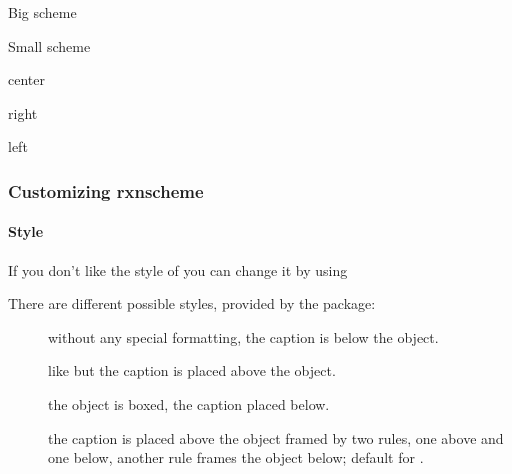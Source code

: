 \documentclass[toc=index,DIV10]{cnpkgdoc}
\begin{document}
\begin{beispiel}
 \begin{rxnscheme}[,,,2]{Big scheme}
  \large\setatomsep{3.5em}
  \arrow[,<=>]{}{}
 \end{rxnscheme}
 \begin{rxnscheme}[,,,.5]{Small scheme}
  \setatomsep{1.15em}\footnotesize
  \arrow[,<=>]{}{}
 \end{rxnscheme}
 \begin{rxnscheme}{center}
  \arrow{}{}
 \end{rxnscheme}
 \begin{rxnscheme}[,,right]{right}
  \arrow{}{}
 \end{rxnscheme}
 \begin{rxnscheme}[,,left]{left}
  \arrow{}{}
 \end{rxnscheme}
\end{beispiel}

\subsubsection{Customizing rxnscheme}
\paragraph{Style}
If you don't like the style of  you can change it by using
\begin{beschreibung}
\end{beschreibung}
There are different possible styles, provided by the  package:
\begin{description}
 \item[] without any special formatting, the caption is below the object.
 \item[] like  but the caption is placed above the object.
 \item[] the object is boxed, the caption placed below.
 \item[] the caption is placed above the object framed by two rules,
   one above and one below, another rule frames the object below; default for
   .
\end{description}
\end{document}
